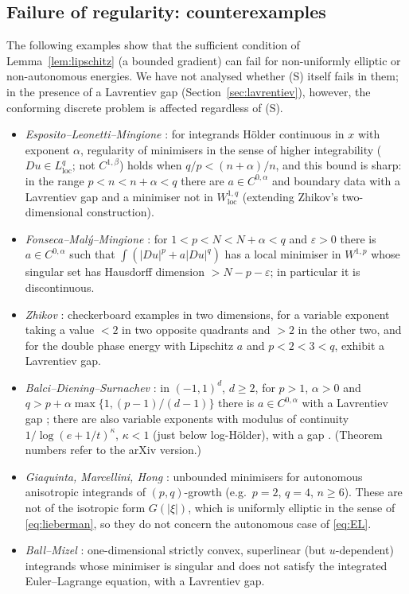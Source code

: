 \documentclass[11pt]{amsart}
\theoremstyle{definition}
\theoremstyle{remark}
\numberwithin{equation}{section}
\newcommand{\abs}[1]{\lvert #1\rvert}
\begin{document}
\subsection{Failure of regularity: counterexamples}\label{ssec:counter}
The following examples show that the sufficient condition of Lemma~\ref{lem:lipschitz} (a bounded gradient) can fail for non-uniformly elliptic or non-autonomous energies. We have not analysed whether (S) itself fails in them; in the presence of a Lavrentiev gap (Section~\ref{sec:lavrentiev}), however, the conforming discrete problem is affected regardless of (S).
\begin{itemize}[leftmargin=1.5em]
\item \emph{Esposito--Leonetti--Mingione} \cite{ELM2004}: for integrands H\"older continuous in $x$ with exponent $\alpha$, regularity of minimisers in the sense of higher integrability ($Du\in L^q_{\mathrm{loc}}$; not $C^{1,\beta}$) holds when $q/p<(n+\alpha)/n$, and this bound is sharp: in the range $p<n<n+\alpha<q$ there are $a\in C^{0,\alpha}$ and boundary data with a Lavrentiev gap and a minimiser not in $W^{1,q}_{\mathrm{loc}}$ (extending Zhikov's two-dimensional construction).
\item \emph{Fonseca--Mal\'y--Mingione} \cite{FMM2004}: for $1<p<N<N+\alpha<q$ and $\varepsilon>0$ there is $a\in C^{0,\alpha}$ such that $\int(\abs{Du}^p+a\abs{Du}^q)$ has a local minimiser in $W^{1,p}$ whose singular set has Hausdorff dimension $>N-p-\varepsilon$; in particular it is discontinuous.
\item \emph{Zhikov} \cite{Zhikov1986,Zhikov1995}: checkerboard examples in two dimensions, for a variable exponent taking a value $<2$ in two opposite quadrants and $>2$ in the other two, and for the double phase energy with Lipschitz $a$ and $p<2<3<q$, exhibit a Lavrentiev gap.
\item \emph{Balci--Diening--Surnachev} \cite{BDS2020}: in $(-1,1)^d$, $d\ge2$, for $p>1$, $\alpha>0$ and $q>p+\alpha\max\{1,(p-1)/(d-1)\}$ there is $a\in C^{0,\alpha}$ with a Lavrentiev gap \cite[Thm.~32]{BDS2020}; there are also variable exponents with modulus of continuity $1/\log(e+1/t)^\kappa$, $\kappa<1$ (just below log-H\"older), with a gap \cite[Thm.~30]{BDS2020}. (Theorem numbers refer to the arXiv version.)
\item \emph{Giaquinta, Marcellini, Hong} \cite{Giaquinta1987,Marcellini1989,Marcellini1991,Hong1992}: unbounded minimisers for autonomous anisotropic integrands of $(p,q)$-growth (e.g.\ $p=2$, $q=4$, $n\ge6$). These are not of the isotropic form $G(\abs\xi)$, which is uniformly elliptic in the sense of \eqref{eq:lieberman}, so they do not concern the autonomous case of \eqref{eq:EL}.
\item \emph{Ball--Mizel} \cite{BallMizel1985}: one-dimensional strictly convex, superlinear (but $u$-dependent) integrands whose minimiser is singular and does not satisfy the integrated Euler--Lagrange equation, with a Lavrentiev gap.
\end{itemize}
\end{document}
